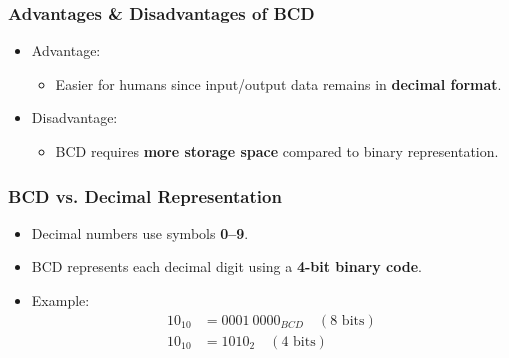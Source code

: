\documentclass[a4paper,12pt]{article}
\begin{document}
\subsubsection{Advantages \& Disadvantages of BCD}
\begin{itemize}
\item {Advantage:}
\begin{itemize}
    \item Easier for humans since input/output data remains in \textbf{decimal format}.
\end{itemize}
\item{Disadvantage:}
\begin{itemize}
    \item BCD requires \textbf{more storage space} compared to binary representation.
\end{itemize}
\end{itemize}
\subsubsection{BCD vs. Decimal Representation}
\begin{itemize}
    \item Decimal numbers use symbols \textbf{0--9}.
    \item BCD represents each decimal digit using a \textbf{4-bit binary code}.
    \item Example:
    \begin{align*}
        10_{10} &= 0001\ 0000_{BCD} \quad (8\text{ bits})\\
        10_{10} &= 1010_2 \quad (4\text{ bits})
    \end{align*}
\end{itemize}
\end{document}
